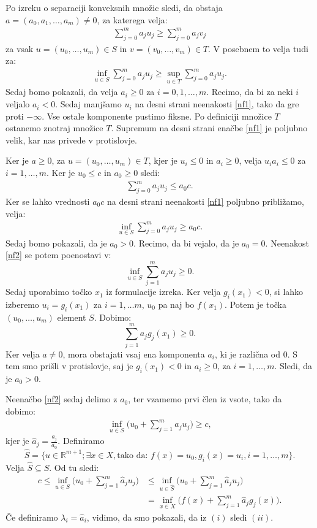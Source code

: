 \documentclass[mat1]{fmfdelo}
\newcommand{\R}{\mathbb R}
\begin{document}
\begin{dokaz}
	
	Po izreku o separaciji konveksnih množic sledi, da obstaja $a = (a_0, a_1, \ldots, a_m)\ne 0$, za katerega velja: 
	\begin{align*}
	\sum_{j=0}^{m}a_ju_j \ge\sum_{j=0}^{m}a_jv_j
	\end{align*}
	za vsak $u = (u_0, \ldots, u_m) \in S$ in $v = (v_0, \ldots, v_m) \in T$. V posebnem to velja tudi za:
	\begin{align}
	\inf_{u \in S}\sum_{j=0}^{m}a_ju_j \ge \sup_{u \in T}\sum_{j=0}^{m}a_ju_j. \label{nf1}
	\end{align}
	Sedaj bomo pokazali, da velja $a_i \ge 0$ za $ i = 0,1, \ldots, m$. Recimo, da bi za neki $i$ veljalo $a_i < 0$. Sedaj manjšamo $u_i$ na desni strani neenakosti \eqref{nf1}, tako da gre proti $-\infty$. Vse ostale komponente pustimo fiksne. Po definiciji množice $T$ ostanemo znotraj množice $T$. Supremum na desni strani enačbe \eqref{nf1} je poljubno velik, kar nas privede v protislovje.  
	
	Ker je $a \ge 0$, za $u = (u_0, \ldots, u_m) \in T$, kjer je $u_i \le 0$ in $a_i \ge 0$, velja $u_ia_i \le 0$ za $i=1,\ldots,m.$ Ker je $u_0 \le c$ in $a_0 \ge 0$ sledi:
	\begin{align*}
	\sum_{j=0}^{m}a_ju_j \le a_0c. 
	\end{align*}
	Ker se lahko vrednosti $a_0c$ na desni strani neenakosti \eqref{nf1} poljubno približamo, velja:
	\begin{align}
	\inf_{u \in S}\sum_{j=0}^{m}a_ju_j \ge a_0c. \label{nf2}
	\end{align}
	Sedaj bomo pokazali, da je $a_0 > 0$. Recimo, da bi vejalo, da je $a_0 =0$. Neenakost \eqref{nf2} se potem poenostavi v: 
	$$ \inf_{u \in S}\sum_{j=1}^{m}a_ju_j \ge 0. $$
	Sedaj uporabimo točko $x_1$ iz formulacije izreka. Ker velja $g_i(x_1) < 0$, si lahko izberemo $u_i = g_i(x_1)$ za $i = 1, \ldots m$, $u_0$ pa naj bo $f(x_1)$. Potem je točka $(u_0, \ldots,u_m)$ element $S.$ Dobimo: 
	$$ \sum_{j= 1}^{m}a_jg_j(x_1) \ge 0. $$
	Ker velja $a \ne 0$, mora obstajati vsaj ena komponenta $a_i$, ki je različna od $0$. S tem smo prišli v protislovje, saj je $g_i(x_1) <0$ in $a_i \ge 0$, za $i= 1, \ldots, m.$ Sledi, da je $a_0 > 0$.
	
	Neenačbo \eqref{nf2} sedaj delimo z $a_0$, ter vzamemo prvi člen iz vsote, tako da dobimo: 
	\begin{align}
	\inf_{u \in S} \Big( u_0 + \sum_{j=1}^{m}\widehat{a}_ju_j			\Big) \ge c,  \label{nf3}
	\end{align}
	kjer je $\widehat{a}_j = \frac{a_j}{a_0}$. Definiramo
	$$ \widehat{S} = \{u \in \R^{m+1}; \exists x \in X, \text{tako da: } f(x) = u_0, g_i(x) = u_i, i=1, \ldots, m \}.$$
	Velja $\widehat{S} \subseteq S.$ Od tu sledi:
	\begin{align*}
	c \le \inf_{u \in S} \Big( u_0 + \sum_{j=1}^{m}\widehat{a}_ju_j \Big)	&\le\inf_{u \in \widehat{S}} \Big( u_0 + \sum_{j=1}^{m}\widehat{a}_ju_j \Big)	\\
	&= \inf_{x \in X}\Big(f(x) + \sum_{j=1}^{m}\widehat{a}_jg_j(x)			\Big).
	\end{align*}	
	Če definiramo $\lambda_i = \widehat{a}_i$, vidimo, da smo pokazali, da iz $(i)$ sledi $(ii)$.
\end{dokaz}
\end{document}
